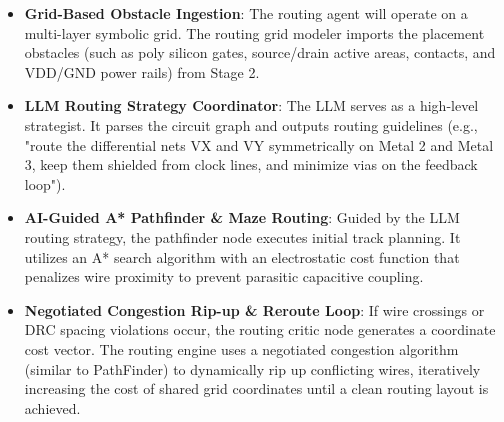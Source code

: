 \begin{itemize}
    \item \textbf{Grid-Based Obstacle Ingestion}: The routing agent will operate on a multi-layer symbolic grid. The routing grid modeler imports the placement obstacles (such as poly silicon gates, source/drain active areas, contacts, and VDD/GND power rails) from Stage 2.
    \item \textbf{LLM Routing Strategy Coordinator}: The LLM serves as a high-level strategist. It parses the circuit graph and outputs routing guidelines (e.g., "route the differential nets VX and VY symmetrically on Metal 2 and Metal 3, keep them shielded from clock lines, and minimize vias on the feedback loop").
    \item \textbf{AI-Guided A* Pathfinder \& Maze Routing}: Guided by the LLM routing strategy, the pathfinder node executes initial track planning. It utilizes an A* search algorithm with an electrostatic cost function that penalizes wire proximity to prevent parasitic capacitive coupling.
    \item \textbf{Negotiated Congestion Rip-up \& Reroute Loop}: If wire crossings or DRC spacing violations occur, the routing critic node generates a coordinate cost vector. The routing engine uses a negotiated congestion algorithm (similar to PathFinder) to dynamically rip up conflicting wires, iteratively increasing the cost of shared grid coordinates until a clean routing layout is achieved.
\end{itemize}

